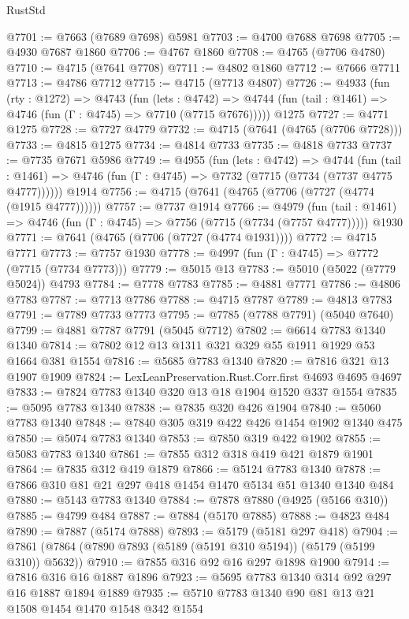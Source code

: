 \begin{lexlean}{RustStd}
\begin{coremodule}
@7701 := @7663 (@7689 @7698) @5981
@7703 := @4700 @7688 @7698
@7705 := @4930 @7687 @1860
@7706 := @4767 @1860
@7708 := @4765 (@7706 @4780)
@7710 := @4715 (@7641 @7708)
@7711 := @4802 @1860
@7712 := @7666 @7711
@7713 := @4786 @7712
@7715 := @4715 (@7713 @4807)
@7726 := @4933
    (fun (rty : @1272) =>
    @4743
      (fun (lets : @4742) =>
      @4744 (fun (tail : @1461) => @4746 (fun (Γ : @4745) => @7710 (@7715 @7676)))))
    @1275
@7727 := @4771 @1275
@7728 := @7727 @4779
@7732 := @4715 (@7641 (@4765 (@7706 @7728)))
@7733 := @4815 @1275
@7734 := @4814 @7733
@7735 := @4818 @7733
@7737 := @7735 @7671 @5986
@7749 := @4955
    (fun (lets : @4742) =>
    @4744
      (fun (tail : @1461) => @4746 (fun (Γ : @4745) => @7732 (@7715 (@7734 (@7737 @4775 @4777))))))
    @1914
@7756 := @4715 (@7641 (@4765 (@7706 (@7727 (@4774 (@1915 @4777))))))
@7757 := @7737 @1914
@7766 := @4979
    (fun (tail : @1461) => @4746 (fun (Γ : @4745) => @7756 (@7715 (@7734 (@7757 @4777)))))
    @1930
@7771 := @7641 (@4765 (@7706 (@7727 (@4774 @1931))))
@7772 := @4715 @7771
@7773 := @7757 @1930
@7778 := @4997 (fun (Γ : @4745) => @7772 (@7715 (@7734 @7773)))
@7779 := @5015 @13
@7783 := @5010 (@5022 (@7779 @5024)) @4793
@7784 := @7778 @7783
@7785 := @4881 @7771
@7786 := @4806 @7783
@7787 := @7713 @7786
@7788 := @4715 @7787
@7789 := @4813 @7783
@7791 := @7789 @7733 @7773
@7795 := @7785 (@7788 @7791) (@5040 @7640)
@7799 := @4881 @7787 @7791 (@5045 @7712)
@7802 := @6614 @7783 @1340 @1340
@7814 := @7802 @12 @13 @1311 @321 @329 @55 @1911 @1929 @53 @1664 @381 @1554
@7816 := @5685 @7783 @1340
@7820 := @7816 @321 @13 @1907 @1909
@7824 := LexLeanPreservation.Rust.Corr.first @4693 @4695 @4697
@7833 := @7824 @7783 @1340 @320 @13 @18 @1904 @1520 @337 @1554
@7835 := @5095 @7783 @1340
@7838 := @7835 @320 @426 @1904
@7840 := @5060 @7783 @1340
@7848 := @7840 @305 @319 @422 @426 @1454 @1902 @1340 @475
@7850 := @5074 @7783 @1340
@7853 := @7850 @319 @422 @1902
@7855 := @5083 @7783 @1340
@7861 := @7855 @312 @318 @419 @421 @1879 @1901
@7864 := @7835 @312 @419 @1879
@7866 := @5124 @7783 @1340
@7878 := @7866 @310 @81 @21 @297 @418 @1454 @1470 @5134 @51 @1340 @1340 @484
@7880 := @5143 @7783 @1340
@7884 := @7878 @7880 (@4925 (@5166 @310))
@7885 := @4799 @484
@7887 := @7884 (@5170 @7885)
@7888 := @4823 @484
@7890 := @7887 (@5174 @7888)
@7893 := @5179 (@5181 @297 @418)
@7904 := @7861 (@7864 (@7890 @7893 (@5189 (@5191 @310 @5194)) (@5179 (@5199 @310)) @5632))
@7910 := @7855 @316 @92 @16 @297 @1898 @1900
@7914 := @7816 @316 @16 @1887 @1896
@7923 := @5695 @7783 @1340 @314 @92 @297 @16 @1887 @1894 @1889
@7935 := @5710 @7783 @1340 @90 @81 @13 @21 @1508 @1454 @1470 @1548 @342 @1554

\end{coremodule}
\end{lexlean}
